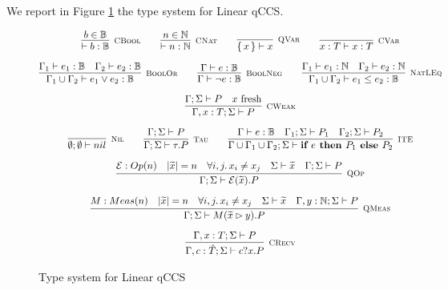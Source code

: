 We report in Figure \ref{typesystem} the type system for Linear qCCS.


\begin{figure}[h!]
\caption{Type system for Linear qCCS}
\label{typesystem}
\begin{gather*}
\infer[\mbox{\footnotesize\scshape CBool}]{\vdash b : \mathbb{B}}{b \in \mathbb{B}} \qquad
\infer[\mbox{\footnotesize\scshape CNat}]{\vdash n : \mathbb{N}}{n \in \mathbb{N}} \qquad
\infer[\mbox{\footnotesize\scshape QVar}]{\set{x} \vdash x}{} \qquad
\infer[\mbox{\footnotesize\scshape CVar}]{x : T \vdash x : T}{} \\[0.2cm]
\infer[\mbox{\footnotesize\scshape BoolOr}]{\Gamma_1 \cup \Gamma_2 \vdash e_1 \lor e_2 : \mathbb{B}}{\Gamma_1 \vdash e_1 : \mathbb{B} & \Gamma_2 \vdash e_2 : \mathbb{B}} \qquad
\infer[\mbox{\footnotesize\scshape BoolNeg}]{\Gamma \vdash \neg e : \mathbb{B}}{\Gamma \vdash e : \mathbb{B}} \qquad
\infer[\mbox{\footnotesize\scshape NatLEq}]{\Gamma_1 \cup \Gamma_2 \vdash e_1 \leq e_2 : \mathbb{B}}{\Gamma_1 \vdash e_1 : \mathbb{N} & \Gamma_2 \vdash e_2 : \mathbb{N}} \\[0.2cm]
 \infer[\mbox{\footnotesize\scshape CWeak}]{\Gamma, x : T; \Sigma \vdash P}{\Gamma; \Sigma \vdash P & \text{$x$ fresh}} \\[0.2cm]
\infer[\mbox{\footnotesize\scshape Nil}]{\emptyset; \emptyset \vdash nil}{} \qquad
\infer[\mbox{\footnotesize\scshape Tau}]{\Gamma; \Sigma \vdash \tau . P}{ \Gamma; \Sigma \vdash P} \qquad
\infer[\mbox{\footnotesize\scshape ITE}]{\Gamma \cup \Gamma_1 \cup \Gamma_2; \Sigma \vdash \ite{e}{P_1}{P_2}}{\Gamma \vdash e : \mathbb{B} & \Gamma_1; \Sigma \vdash P_1 & \Gamma_2; \Sigma \vdash P_2} \\[0.2cm]
\infer[\mbox{\footnotesize\scshape QOp}]
{\Gamma; \Sigma \vdash \mathcal{E}(\widetilde{x}) . P}
{\mathcal{E}: Op(n) & |\widetilde{x}| = n & \forall i, j \ldotp x_i \neq x_j & \Sigma \vdash \widetilde{x} & \Gamma; \Sigma \vdash P} \\[0.2cm]
\infer[\mbox{\footnotesize\scshape QMeas}]{\Gamma; \Sigma \vdash M(\widetilde{x} \rhd y) . P}
{M: Meas(n) & |\widetilde{x}| = n &  \forall i, j \ldotp x_i \neq x_j  & \Sigma \vdash \widetilde{x} & \Gamma, y : \mathbb{N}; \Sigma \vdash P} \\[0.2cm]
\infer[\mbox{\footnotesize\scshape CRecv}]
{\Gamma, c : \hat{T}; \Sigma \vdash c?x . P}
{\Gamma, x : T; \Sigma \vdash P} 

\end{gather*}
\end{figure}
